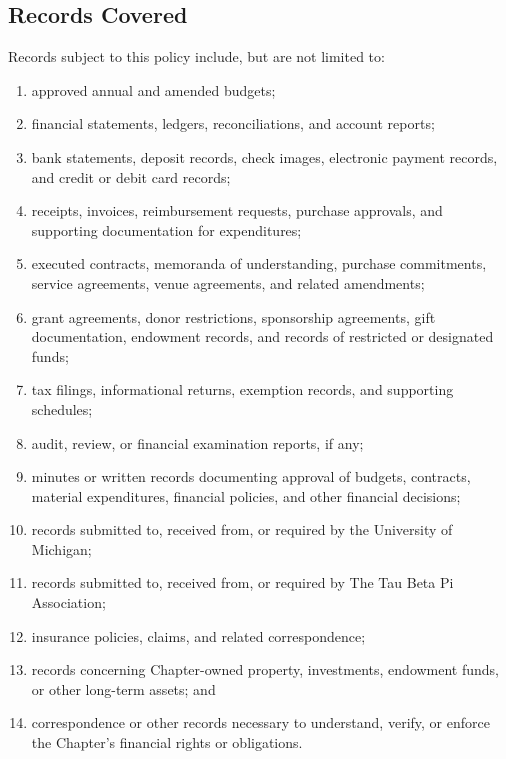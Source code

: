 \subsection{Records Covered} \label{XII.5}
Records subject to this policy include, but are not limited to:
\begin{enumerate}
    \item approved annual and amended budgets;
    \item financial statements, ledgers, reconciliations, and account reports;
    \item bank statements, deposit records, check images, electronic payment records, and credit or debit card records;
    \item receipts, invoices, reimbursement requests, purchase approvals, and supporting documentation for expenditures;
    \item executed contracts, memoranda of understanding, purchase commitments, service agreements, venue agreements, and related amendments;
    \item grant agreements, donor restrictions, sponsorship agreements, gift documentation, endowment records, and records of restricted or designated funds;
    \item tax filings, informational returns, exemption records, and supporting schedules;
    \item audit, review, or financial examination reports, if any;
    \item minutes or written records documenting approval of budgets, contracts, material expenditures, financial policies, and other financial decisions;
    \item records submitted to, received from, or required by the University of Michigan;
    \item records submitted to, received from, or required by The Tau Beta Pi Association;
    \item insurance policies, claims, and related correspondence;
    \item records concerning Chapter-owned property, investments, endowment funds, or other long-term assets; and
    \item correspondence or other records necessary to understand, verify, or enforce the Chapter’s financial rights or obligations.
\end{enumerate}


